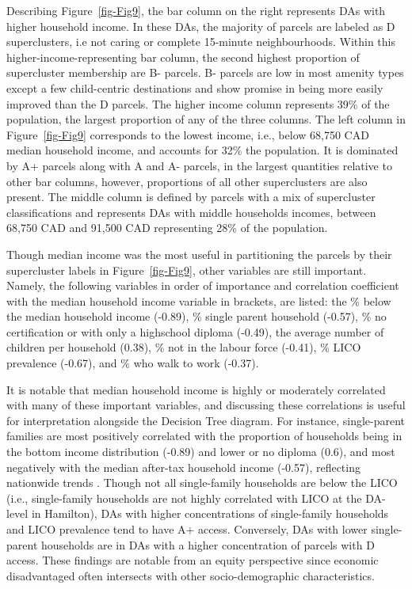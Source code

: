 \documentclass[
  authoryear,
  preprint,
  3p]{elsarticle}
\begin{document}
Describing Figure~\ref{fig-Fig9}, the bar column on the right represents
DAs with higher household income. In these DAs, the majority of parcels
are labeled as D superclusters, i.e not caring or complete 15-minute
neighbourhoods. Within this higher-income-representing bar column, the
second highest proportion of supercluster membership are B- parcels. B-
parcels are low in most amenity types except a few child-centric
destinations and show promise in being more easily improved than the D
parcels. The higher income column represents 39\% of the population, the
largest proportion of any of the three columns. The left column in
Figure~\ref{fig-Fig9} corresponds to the lowest income, i.e., below
68,750 CAD median household income, and accounts for 32\% the
population. It is dominated by A+ parcels along with A and A- parcels,
in the largest quantities relative to other bar columns, however,
proportions of all other superclusters are also present. The middle
column is defined by parcels with a mix of supercluster classifications
and represents DAs with middle households incomes, between 68,750 CAD
and 91,500 CAD representing 28\% of the population.

Though median income was the most useful in partitioning the parcels by
their supercluster labels in Figure~\ref{fig-Fig9}, other variables are
still important. Namely, the following variables in order of importance
and correlation coefficient with the median household income variable in
brackets, are listed: the \% below the median household income (-0.89),
\% single parent household (-0.57), \% no certification or with only a
highschool diploma (-0.49), the average number of children per household
(0.38), \% not in the labour force (-0.41), \% LICO prevalence (-0.67),
and \% who walk to work (-0.37).

It is notable that median household income is highly or moderately
correlated with many of these important variables, and discussing these
correlations is useful for interpretation alongside the Decision Tree
diagram. For instance, single-parent families are most positively
correlated with the proportion of households being in the bottom income
distribution (-0.89) and lower or no diploma (0.6), and most negatively
with the median after-tax household income (-0.57), reflecting
nationwide trends
\citep{governmentofcanadaDailyMainHighlights2024, governmentofcanadaPrevalenceLowIncome2024}.
Though not all single-family households are below the LICO (i.e.,
single-family households are not highly correlated with LICO at the
DA-level in Hamilton), DAs with higher concentrations of single-family
households and LICO prevalence tend to have A+ access. Conversely, DAs
with lower single-parent households are in DAs with a higher
concentration of parcels with D access. These findings are notable from
an equity perspective since economic disadvantaged often intersects with
other socio-demographic characteristics.
\end{document}

